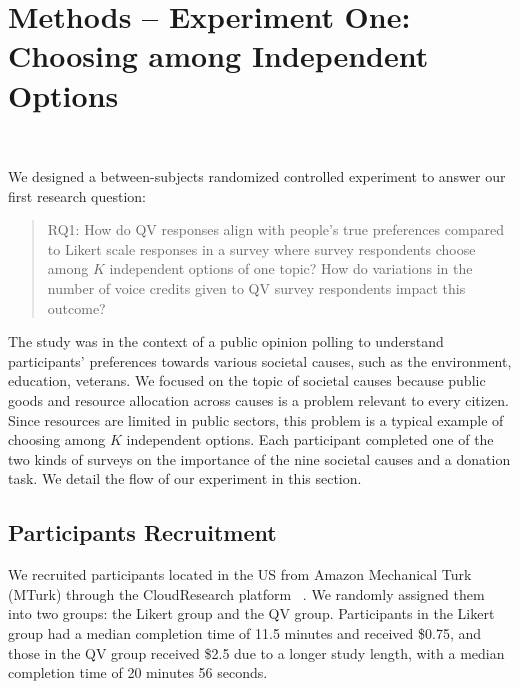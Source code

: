 \section{Methods -- Experiment One: Choosing among Independent Options}~\label{method_exp1}

We designed a between-subjects randomized controlled experiment to answer our first research question: \begin{quote} RQ1: How do QV responses align with people's true preferences compared to Likert scale responses in a survey where survey respondents choose among $K$ independent options of one topic? How do variations in the number of voice credits given to QV survey respondents impact this outcome? \end{quote} The study was in the context of a public opinion polling to understand participants' preferences towards various societal causes, such as the environment, education, veterans. We focused on the topic of societal causes because public goods and resource allocation across causes is a problem relevant to every citizen. Since resources are limited in public sectors, this problem is a typical example of choosing among $K$ independent options. Each participant completed one of the two kinds of surveys on the importance of the nine societal causes and a donation task. We detail the flow of our experiment in this section.

\subsection{Participants Recruitment}
We recruited participants located in the US from Amazon Mechanical Turk (MTurk) through the CloudResearch platform~\cite{litman2017turkprime} {}. {} We randomly assigned them into two groups: the Likert group and the QV group. Participants in the Likert group had a median completion time of 11.5 minutes and received \$0.75, and those in the QV group received \$2.5 due to a longer study length, with a median completion time of 20 minutes 56 seconds.

